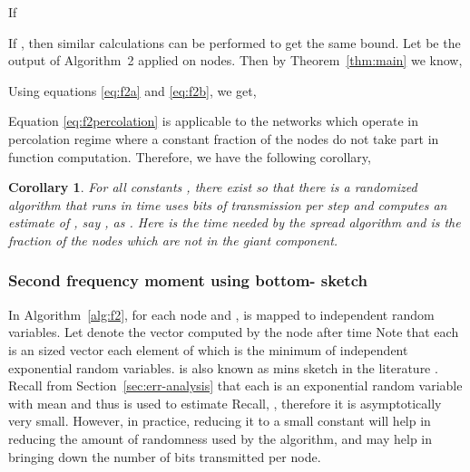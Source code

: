 \documentclass[10pt,twosided,a4paper,draft,onecolumn]{article}
\newtheorem{corollary}{Corollary}
\begin{document}
If 

If , then similar calculations can be performed to
get the same bound. Let  be the output of
Algorithm~2 applied on  nodes. Then by
Theorem~\ref{thm:main} we know,
  
Using equations \ref{eq:f2a} and \ref{eq:f2b}, we get,

Equation \ref{eq:f2percolation} is applicable to the networks which
operate in percolation regime where a constant fraction of the nodes
do not take part in function computation. Therefore, we have the
following corollary,
\begin{corollary}
  \label{corollary:percolation}
  For all constants , there exist  so that there is a randomized algorithm that runs in time  uses  bits of transmission per step and computes an estimate of
  , say , as 
  . Here  is the time
  needed by the spread algorithm and  is the fraction of the
  nodes which are not in the giant
  component.
\end{corollary}

\subsubsection{Second frequency moment using bottom- sketch}
\label{sec:bottom_sketch}

In Algorithm~\ref{alg:f2}, for each node  and ,
 is mapped to  independent random variables. Let   denote
the vector computed by the node  after time  Note that each
 is an  sized vector each element of which is the minimum
of  independent exponential random variables.  is also known
as mins sketch in the literature \cite{Cohen07}. Recall from
Section~\ref{sec:err-analysis} that each  is an
exponential random variable with mean  and thus is used to
estimate  Recall, , therefore it is
asymptotically very small. However, in practice, reducing it to a
small constant will help in reducing the amount of randomness used by
the algorithm, and may help in bringing down the number of bits
transmitted per node.
\end{document}
